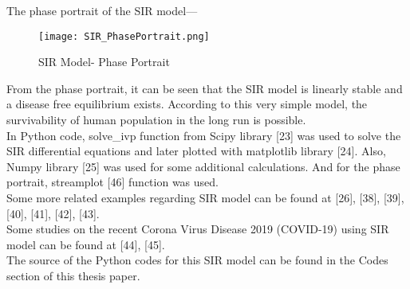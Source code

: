 The phase portrait of the SIR model--- \\

\begin{figure}[H]
\centering
\texttt{[image: SIR\_PhasePortrait.png]}
\caption{SIR Model- Phase Portrait}
\label{fig:SIR Model Phase Portrait}
\end{figure}

From the phase portrait, it can be seen that the SIR model is linearly stable and a disease free equilibrium exists. According to this very simple model, the survivability of human population in the long run is possible. \\

In Python code, solve\_ivp function from Scipy library [23] was used to solve the SIR differential equations and later plotted with matplotlib library [24]. Also, Numpy library [25] was used for some additional calculations. And for the phase portrait, streamplot [46] function was used. \\

Some more related examples regarding SIR model can be found at [26], [38], [39], [40], [41], [42], [43]. \\

Some studies on the recent Corona Virus Disease 2019 (COVID-19) using SIR model can be found at [44], [45]. \\

The source of the Python codes for this SIR model can be found in the Codes section of this thesis paper.










